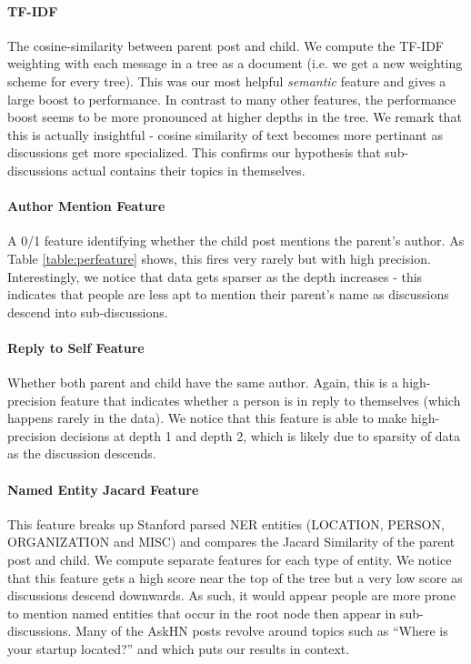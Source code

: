 \documentclass[10pt]{article}
\begin{document}
\paragraph{TF-IDF} The cosine-similarity between parent post and child. We compute the 
TF-IDF weighting with each message in a tree as a document (i.e. we get a new weighting
scheme for every tree). This was our most helpful \textit{semantic} feature and
gives a large boost to performance. In contrast to many other
features, the performance boost seems to be more pronounced at higher depths in
the tree. We remark that this is actually insightful - cosine similarity of text
becomes more pertinant as discussions get more specialized. This confirms our
hypothesis that sub-discussions actual contains their topics in themselves.

\paragraph{Author Mention Feature} A 0/1 feature identifying whether the child 
post mentions the parent's author. As Table \ref{table:perfeature} shows, this
fires very rarely but with high precision. Interestingly, we notice that data gets
sparser as the depth increases - this indicates that people are less apt to 
mention their parent's name as discussions descend into sub-discussions.

\paragraph{Reply to Self Feature} Whether both parent and child have the same
author. Again, this is a high-precision feature that indicates whether a person
is in reply to themselves (which happens rarely in the data). We notice that
this feature is able to make high-precision decisions at depth 1 and depth 2,
which is likely due to sparsity of data as the discussion descends. 

\paragraph{Named Entity Jacard Feature} This feature breaks up Stanford parsed NER
entities (LOCATION, PERSON, ORGANIZATION and MISC) and compares the Jacard Similarity
of the parent post and child. We compute separate features for each type of entity.
We notice that this feature gets a high score near the top of the tree but a very low
score as  discussions descend downwards. As such, it would appear people are
more prone to mention named entities that occur in the root node then appear
in sub-discussions. Many of the AskHN posts revolve around topics such as
``Where is your startup located?'' and which puts our results in context.
\end{document}
